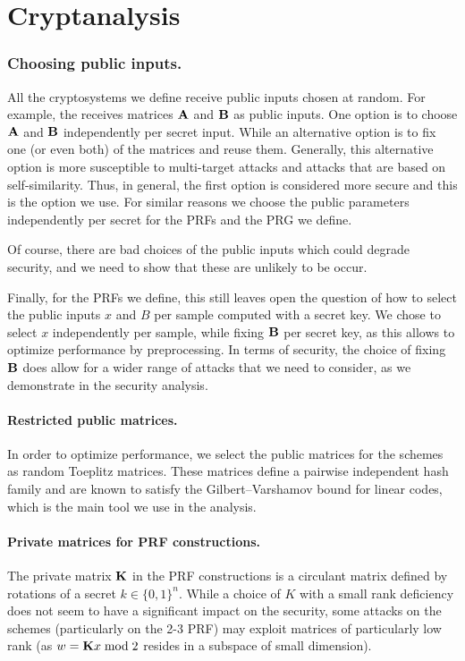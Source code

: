 

\section{Cryptanalysis}



\subsubsection{Choosing public inputs.}

All the cryptosystems we define receive public inputs chosen at random.
For example, the \ttOWF receives matrices $\mat{A}$ and $\mat{B}$ as public inputs.
One option is to choose $\mat{A}$ and $\mat{B}$ independently per secret input.
While an alternative option is to fix one (or even both) of the matrices and reuse them.
Generally, this alternative option is more susceptible to multi-target
attacks and attacks that are based on self-similarity.
Thus, in general, the first option is considered more secure and this is the option we use.
For similar reasons we choose the public parameters independently per secret for the
PRFs and the PRG we define.

Of course, there are bad choices of the public inputs which could degrade security,
and we need to show that these are unlikely to be occur.

Finally, for the PRFs we define, this still leaves open the question of how to select the public inputs $x$ and $B$
per sample computed with a secret key. We chose to select $x$ independently per sample,
while fixing $\mat{B}$ per secret key, as this allows to optimize performance by preprocessing.
In terms of security, the choice of fixing $\mat{B}$ does allow for a wider range of attacks
that we need to consider, as we demonstrate in the security analysis.

\paragraph{Restricted public matrices.}
In order to optimize performance, we select the public matrices
for the schemes as random Toeplitz matrices. These matrices
define a pairwise independent hash family and are known to satisfy the
Gilbert–Varshamov bound for linear codes, which is the main tool we use in the analysis.

\paragraph{Private matrices for PRF constructions.}
The private matrix $\mat{K}$ in the PRF constructions is a circulant matrix
defined by rotations of a secret $k \in \{0,1\}^n$.
While a choice of $K$ with a small rank deficiency does not seem to
have a significant impact on the security,
some attacks on the schemes (particularly on the 2-3 PRF) may exploit
matrices of particularly low rank
(as $w = \mat{K}x \bmod 2$ resides in a subspace of small dimension).

